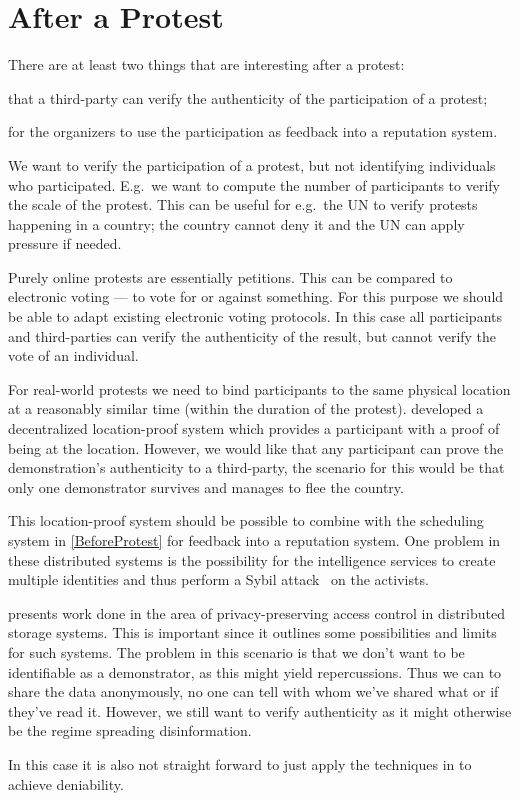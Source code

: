 \section{After a Protest}
\label{AfterProtest}

There are at least two things that are interesting after a protest:
\begin{inparaenum}[(a)]
\item that a third-party can verify the authenticity of the participation of 
  a protest;
\item for the organizers to use the participation as feedback into a reputation 
  system.
\end{inparaenum}
We want to verify the participation of a protest, but not identifying 
individuals who participated.
E.g.\ we want to compute the number of participants to verify the scale of the 
protest.
This can be useful for e.g.\ the UN to verify protests happening in a country; 
the country cannot deny it and the UN can apply pressure if needed.

Purely online protests are essentially petitions.
This can be compared to electronic voting --- to vote for or against something.
For this purpose we should be able to adapt existing electronic voting 
protocols.
In this case all participants and third-parties can verify the authenticity of 
the result, but cannot verify the vote of an individual.

For real-world protests we need to bind participants to the same physical 
location at a reasonably similar time (within the duration of the protest).
\citet{PROPS} developed a decentralized location-proof system which provides 
a participant with a proof of being at the location.
However, we would like that any participant can prove the demonstration's 
authenticity to a third-party, the scenario for this would be that only one 
demonstrator survives and manages to flee the country.

This location-proof system should be possible to combine with the scheduling 
system in \cref{BeforeProtest} for feedback into a reputation system.
One problem in these distributed systems is the possibility for the 
intelligence services to create multiple identities and thus perform a Sybil 
attack~\cite{SybilAttack} on the activists.

\citet{PPACforPubFS} presents work done in the area of privacy-preserving 
access control in distributed storage systems.
This is important since it outlines some possibilities and limits for such 
systems.
The problem in this scenario is that we don't want to be identifiable as 
a demonstrator, as this might yield repercussions.
Thus we can to share the data anonymously, no one can tell with whom we've 
shared what or if they've read it.
However, we still want to verify authenticity as it might otherwise be the 
regime spreading disinformation.

In this case it is also not straight forward to just apply the techniques in 
\cite{OTPKX} to achieve deniability.

